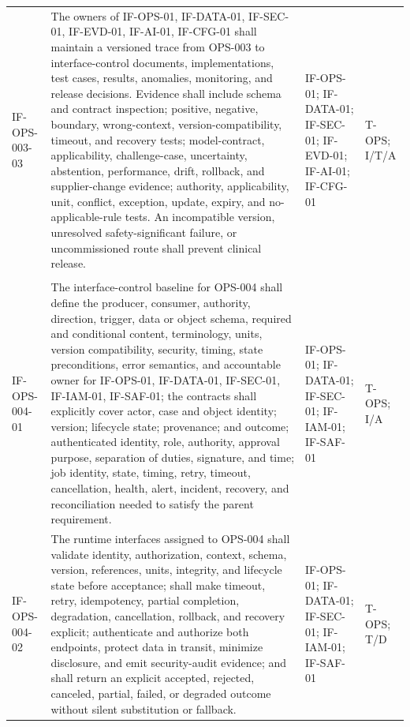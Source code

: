 \documentclass[11pt,letterpaper]{article}
\begin{document}
\begin{scriptsize}
\begin{longtable}{@{}L{0.14\textwidth}L{0.49\textwidth}L{0.19\textwidth}L{0.10\textwidth}@{}}
\addlinespace[2pt]
\mbox{IF-OPS-003-03} & The owners of IF-OPS-01, IF-DATA-01, IF-SEC-01, IF-EVD-01, IF-AI-01, IF-CFG-01 shall maintain a versioned trace from OPS-003 to interface-control documents, implementations, test cases, results, anomalies, monitoring, and release decisions. Evidence shall include schema and contract inspection; positive, negative, boundary, wrong-context, version-compatibility, timeout, and recovery tests; model-contract, applicability, challenge-case, uncertainty, abstention, performance, drift, rollback, and supplier-change evidence; authority, applicability, unit, conflict, exception, update, expiry, and no-applicable-rule tests. An incompatible version, unresolved safety-significant failure, or uncommissioned route shall prevent clinical release. & IF-OPS-01; IF-DATA-01; IF-SEC-01; IF-EVD-01; IF-AI-01; IF-CFG-01 & T-OPS; I\slash\allowbreak{}T\slash\allowbreak{}A \\
\addlinespace[2pt]
 \\
\addlinespace[2pt]
\mbox{IF-OPS-004-01} & The interface-control baseline for OPS-004 shall define the producer, consumer, authority, direction, trigger, data or object schema, required and conditional content, terminology, units, version compatibility, security, timing, state preconditions, error semantics, and accountable owner for IF-OPS-01, IF-DATA-01, IF-SEC-01, IF-IAM-01, IF-SAF-01; the contracts shall explicitly cover actor, case and object identity; version; lifecycle state; provenance; and outcome; authenticated identity, role, authority, approval purpose, separation of duties, signature, and time; job identity, state, timing, retry, timeout, cancellation, health, alert, incident, recovery, and reconciliation needed to satisfy the parent requirement. & IF-OPS-01; IF-DATA-01; IF-SEC-01; IF-IAM-01; IF-SAF-01 & T-OPS; I\slash\allowbreak{}A \\
\addlinespace[2pt]
\mbox{IF-OPS-004-02} & The runtime interfaces assigned to OPS-004 shall validate identity, authorization, context, schema, version, references, units, integrity, and lifecycle state before acceptance; shall make timeout, retry, idempotency, partial completion, degradation, cancellation, rollback, and recovery explicit; authenticate and authorize both endpoints, protect data in transit, minimize disclosure, and emit security-audit evidence; and shall return an explicit accepted, rejected, canceled, partial, failed, or degraded outcome without silent substitution or fallback. & IF-OPS-01; IF-DATA-01; IF-SEC-01; IF-IAM-01; IF-SAF-01 & T-OPS; T\slash\allowbreak{}D \\

\end{longtable}
\end{scriptsize}
\end{document}
